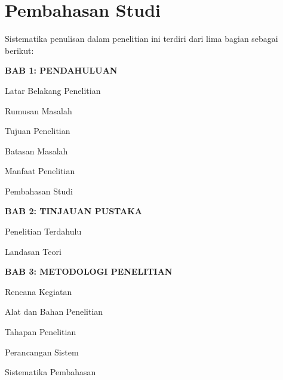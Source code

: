 	\section{Pembahasan Studi}
	Sistematika penulisan dalam penelitian ini terdiri dari lima bagian sebagai berikut:
	
	\noindent 
	\textbf{BAB 1: PENDAHULUAN}
	\begin{sysenumerate}
		\setcounter{sysenumeratei}{1}
		\item[] 
		\begin{sysenumerate}
			\item Latar Belakang Penelitian 
			\item Rumusan Masalah        
			\item Tujuan Penelitian 
			\item Batasan Masalah
			\item Manfaat Penelitian
			\item Pembahasan Studi
		\end{sysenumerate}
	\end{sysenumerate}
	
	\vspace{1em}

	\noindent 
	\textbf{BAB 2: TINJAUAN PUSTAKA}
	\begin{sysenumerate}
		\setcounter{sysenumeratei}{2}
		\item[] 
		\begin{sysenumerate}
			\item Penelitian Terdahulu         
			\item Landasan Teori
		\end{sysenumerate}
	\end{sysenumerate}
	
	\vspace{1em}
	
	\noindent 
	\textbf{BAB 3: METODOLOGI PENELITIAN}
	\begin{sysenumerate}
		\setcounter{sysenumeratei}{3} 
		\item[] 
		\begin{sysenumerate}
			\item Rencana Kegiatan 
			\item Alat dan Bahan Penelitian
			\item Tahapan Penelitian 
			\item Perancangan Sistem
			\item Sistematika Pembahasan
		\end{sysenumerate}
	\end{sysenumerate}
	
